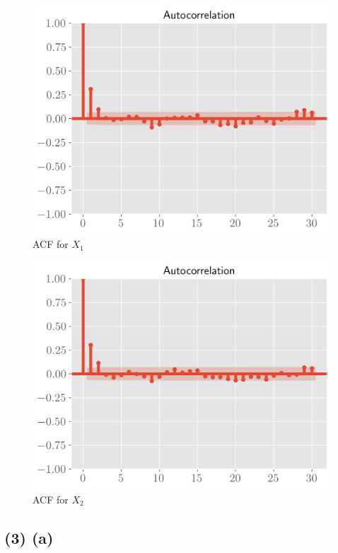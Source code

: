 \documentclass[11pt]{article}
\begin{document}
\begin{figure}[!h]
    \centering
    \includegraphics[scale=.6
    ]{../figures/acf1.png}
    \caption{ACF for $X_1$}
    \label{fig:my_label}
\end{figure}

\begin{figure}[!h]
    \centering
    \includegraphics[scale=.6
    ]{../figures/acf2.png}
    \caption{ACF for $X_2$}
    \label{fig:my_label}
\end{figure}
\clearpage

\subsection*{(3) (a)}
\end{document}
